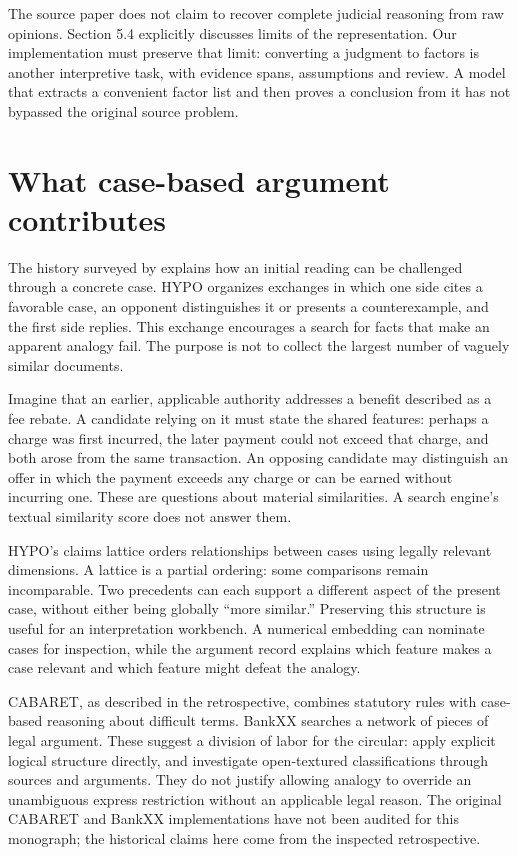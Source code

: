 The source paper does not claim to recover complete judicial reasoning from raw
opinions. Section 5.4 explicitly discusses limits of the representation. Our
implementation must preserve that limit: converting a judgment to factors is
another interpretive task, with evidence spans, assumptions and review. A model
that extracts a convenient factor list and then proves a conclusion from it has
not bypassed the original source problem.

\section{What case-based argument contributes}
\label{merge:M05:02}


The history surveyed by \citet[sections 2--3]{hypolegacy2017} explains how an initial reading can be challenged through a concrete case. HYPO organizes exchanges
in which one side cites a favorable case, an opponent distinguishes it or presents
a counterexample, and the first side replies. This exchange encourages a search
for facts that make an apparent analogy fail. The purpose is not to collect the
largest number of vaguely similar documents.

Imagine that an earlier, applicable authority addresses a benefit described as a
fee rebate. A candidate relying on it must state the shared features: perhaps a
charge was first incurred, the later payment could not exceed that charge, and
both arose from the same transaction. An opposing candidate may distinguish an
offer in which the payment exceeds any charge or can be earned without incurring
one. These are questions about material similarities. A search engine's textual
similarity score does not answer them.

HYPO's claims lattice orders relationships between cases using legally relevant
dimensions. A lattice is a partial ordering: some comparisons remain
incomparable. Two precedents can each support a different aspect of the present
case, without either being globally ``more similar.'' Preserving this structure
is useful for an interpretation workbench. A numerical embedding can nominate
cases for inspection, while the argument record explains which feature makes a
case relevant and which feature might defeat the analogy.


CABARET, as described in the retrospective, combines statutory rules with
case-based reasoning about difficult terms. BankXX searches a network of pieces
of legal argument. These suggest a division of labor for the circular: apply
explicit logical structure directly, and investigate open-textured classifications
through sources and arguments. They do not justify allowing analogy to override
an unambiguous express restriction without an applicable legal reason. The
original CABARET and BankXX implementations have not been audited for this
monograph; the historical claims here come from the inspected retrospective.

